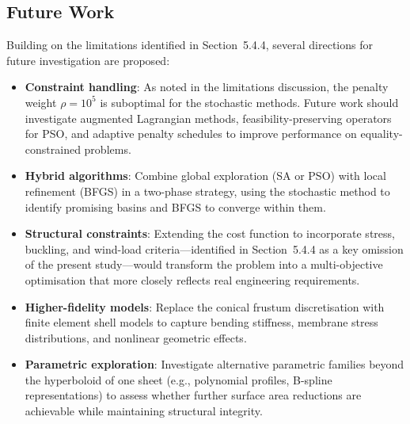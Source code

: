 \subsection{Future Work}

Building on the limitations identified in Section~5.4.4, several directions for future investigation are proposed:

\begin{itemize}
    \item \textbf{Constraint handling}: As noted in the limitations discussion, the penalty weight $\rho = 10^5$ is suboptimal for the stochastic methods. Future work should investigate augmented Lagrangian methods, feasibility-preserving operators for PSO, and adaptive penalty schedules to improve performance on equality-constrained problems.
    
    \item \textbf{Hybrid algorithms}: Combine global exploration (SA or PSO) with local refinement (BFGS) in a two-phase strategy, using the stochastic method to identify promising basins and BFGS to converge within them.
    
    \item \textbf{Structural constraints}: Extending the cost function to incorporate stress, buckling, and wind-load criteria---identified in Section~5.4.4 as a key omission of the present study---would transform the problem into a multi-objective optimisation that more closely reflects real engineering requirements.
    
    \item \textbf{Higher-fidelity models}: Replace the conical frustum discretisation with finite element shell models to capture bending stiffness, membrane stress distributions, and nonlinear geometric effects.
    
    \item \textbf{Parametric exploration}: Investigate alternative parametric families beyond the hyperboloid of one sheet (e.g., polynomial profiles, B-spline representations) to assess whether further surface area reductions are achievable while maintaining structural integrity.
\end{itemize}
